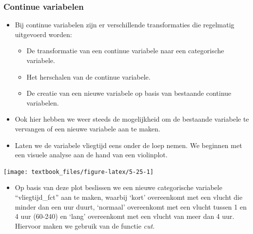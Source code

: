 \documentclass[]{tufte-book}
\newenvironment{Shaded}{}{}
\newcommand{\DataTypeTok}[1]{\textcolor[rgb]{0.56,0.13,0.00}{#1}}
\newcommand{\DecValTok}[1]{\textcolor[rgb]{0.25,0.63,0.44}{#1}}
\newcommand{\KeywordTok}[1]{\textcolor[rgb]{0.00,0.44,0.13}{\textbf{#1}}}
\newcommand{\NormalTok}[1]{#1}
\newcommand{\OperatorTok}[1]{\textcolor[rgb]{0.40,0.40,0.40}{#1}}
\newcommand{\StringTok}[1]{\textcolor[rgb]{0.25,0.44,0.63}{#1}}
\providecommand{\tightlist}{%
  \setlength{\itemsep}{0pt}\setlength{\parskip}{0pt}}
\begin{document}
\hypertarget{continue-variabelen-1}{%
\subsubsection{Continue variabelen}\label{continue-variabelen-1}}

\begin{itemize}
\tightlist
\item
  Bij continue variabelen zijn er verschillende transformaties die regelmatig uitgevoerd worden:

  \begin{itemize}
  \tightlist
  \item
    De transformatie van een continue variabele naar een categorische variabele.
  \item
    Het herschalen van de continue variabele.
  \item
    De creatie van een nieuwe variabele op basis van bestaande continue variabelen.
  \end{itemize}
\item
  Ook hier hebben we weer steeds de mogelijkheid om de bestaande variabele te vervangen of een nieuwe variabele aan te maken.
\item
  Laten we de variabele vliegtijd eens onder de loep nemen. We beginnen met een visuele analyse aan de hand van een violinplot.
\end{itemize}

\begin{Shaded}
\end{Shaded}

\texttt{[image: textbook\_files/figure-latex/5-25-1]}

\begin{itemize}
\tightlist
\item
  Op basis van deze plot beslissen we een nieuwe categorische variabele ``vliegtijd\_fct'' aan te maken, waarbij `kort' overeenkomt met een vlucht die minder dan een uur duurt, `normaal' overeenkomt met een vlucht tussen 1 en 4 uur (60-240) en `lang' overeenkomt met een vlucht van meer dan 4 uur. Hiervoor maken we gebruik van de functie \emph{cut}.
\end{itemize}
\end{document}
